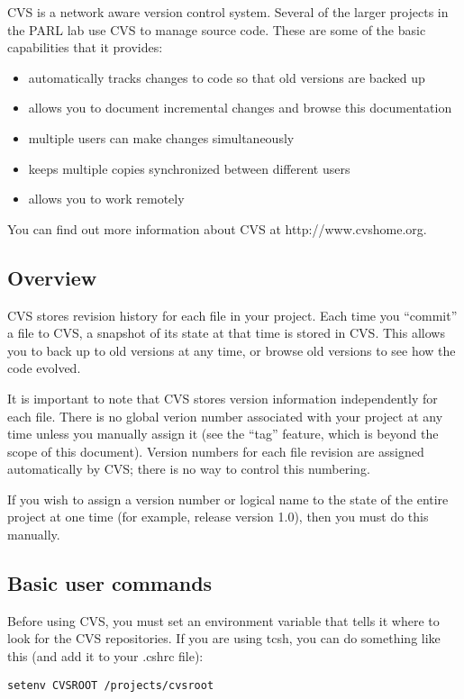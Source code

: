 \documentclass[11pt, letterpaper]{article}
\begin{document}
CVS is a network aware version control system.  Several of the larger
projects in the PARL lab use CVS to manage source code.  These are some of the
basic capabilities that it provides:

\begin{itemize}
	\item automatically tracks changes to code so that 
	old versions are backed up
	\item allows you to document incremental changes and browse this
	documentation
	\item multiple users can make changes simultaneously
	\item keeps multiple copies synchronized between
	different users 
	\item allows you to work remotely
\end{itemize}

You can find out more information about CVS at http://www.cvshome.org.  

\subsection{Overview}

CVS stores revision history for each file in your project.  Each time
you ``commit'' a file to CVS, a snapshot of its state at that time is
stored in CVS.  This allows you to back up to old versions at any time,
or browse old versions to see how the code evolved.

It is important to note that CVS stores version information
independently for each file.   
There is no global verion number
associated with your project at any time unless you manually
assign it (see the ``tag'' feature, which is beyond the scope of this
document).  Version numbers for each file revision are assigned automatically by
CVS; there is no way to control this numbering.   

If you wish to assign a version number or logical name to the state of
the entire project at one time (for example, release version 1.0), then
you must do this manually.

\subsection{Basic user commands}

Before using CVS, you must set an environment variable that tells it
where to look for the CVS repositories.  If you are using tcsh, you can
do something like this (and add it to your .cshrc file):
\begin{verbatim}
setenv CVSROOT /projects/cvsroot
\end{verbatim}
\end{document}
